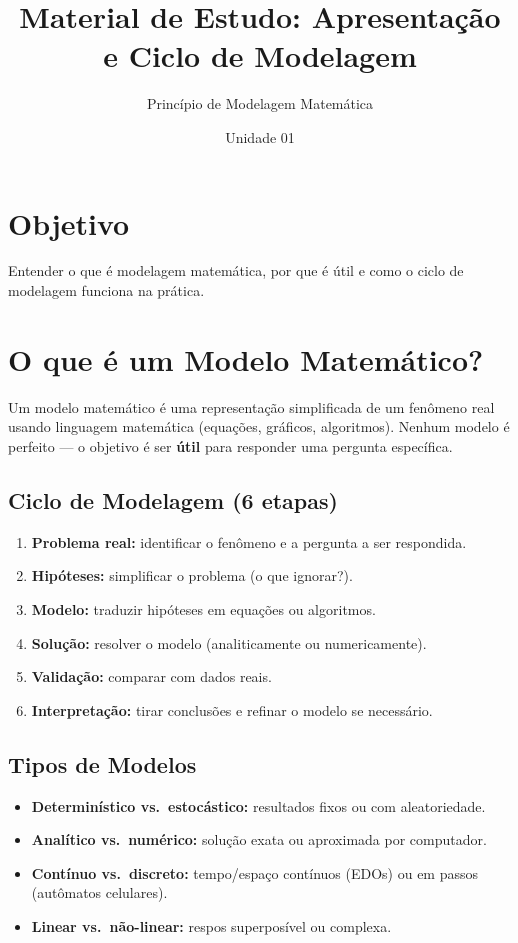 \documentclass[12pt,a4paper]{article}
\title{Material de Estudo: Apresenta\c{c}\~ao e Ciclo de Modelagem}
\author{Princ\'ipio de Modelagem Matem\'atica}
\date{Unidade 01}
\begin{document}
\maketitle

\section*{Objetivo}
Entender o que \'e modelagem matem\'atica, por que \'e \'util e como o ciclo de modelagem funciona na pr\'atica.

\section*{O que \'e um Modelo Matem\'atico?}
Um modelo matem\'atico \'e uma representa\c{c}\~ao simplificada de um fen\^omeno real usando linguagem matem\'atica (equa\c{c}\~oes, gr\'aficos, algoritmos). Nenhum modelo \'e perfeito --- o objetivo \'e ser \textbf{\'util} para responder uma pergunta espec\'ifica.

\subsection*{Ciclo de Modelagem (6 etapas)}
\begin{enumerate}
  \item \textbf{Problema real:} identificar o fen\^omeno e a pergunta a ser respondida.
  \item \textbf{Hip\'oteses:} simplificar o problema (o que ignorar?).
  \item \textbf{Modelo:} traduzir hip\'oteses em equa\c{c}\~oes ou algoritmos.
  \item \textbf{Solu\c{c}\~ao:} resolver o modelo (analiticamente ou numericamente).
  \item \textbf{Valida\c{c}\~ao:} comparar com dados reais.
  \item \textbf{Interpreta\c{c}\~ao:} tirar conclus\~oes e refinar o modelo se necess\'ario.
\end{enumerate}

\subsection*{Tipos de Modelos}
\begin{itemize}
  \item \textbf{Determin\'istico vs.\ estoc\'astico:} resultados fixos ou com aleatoriedade.
  \item \textbf{Anal\'itico vs.\ num\'erico:} solu\c{c}\~ao exata ou aproximada por computador.
  \item \textbf{Cont\'inuo vs.\ discreto:} tempo/espa\c{c}o cont\'inuos (EDOs) ou em passos (autômatos celulares).
  \item \textbf{Linear vs.\ n\~ao-linear:} respos superpos\'ivel ou complexa.
\end{itemize}
\end{document}
